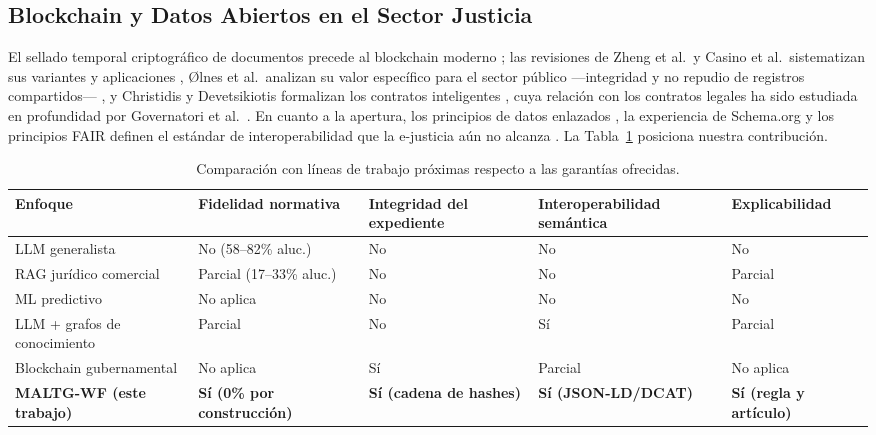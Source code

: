 \documentclass[computers,article,submit,pdftex,moreauthors]{Definitions/mdpi}
\begin{document}
\subsection{Blockchain y Datos Abiertos en el Sector Justicia}
El sellado temporal criptográfico de documentos precede al blockchain moderno \cite{Haber1991}; las revisiones de Zheng et al.\ y Casino et al.\ sistematizan sus variantes y aplicaciones \cite{Zheng2018,Casino2019}, Ølnes et al.\ analizan su valor específico para el sector público ---integridad y no repudio de registros compartidos--- \cite{Olnes2017}, y Christidis y Devetsikiotis formalizan los contratos inteligentes \cite{Christidis2016}, cuya relación con los contratos legales ha sido estudiada en profundidad por Governatori et al.\ \cite{Governatori2018}. En cuanto a la apertura, los principios de datos enlazados \cite{Bizer2009}, la experiencia de Schema.org \cite{Guha2016} y los principios FAIR \cite{Wilkinson2016} definen el estándar de interoperabilidad que la e-justicia aún no alcanza \cite{Rosa2013,Lupo2014}. La Tabla~\ref{tab:related} posiciona nuestra contribución.

\begin{table}[H]
\caption{Comparación con líneas de trabajo próximas respecto a las garantías ofrecidas.}
\label{tab:related}
\begin{tabularx}{\textwidth}{lXXXX}
\toprule
\textbf{Enfoque} & \textbf{Fidelidad normativa} & \textbf{Integridad del expediente} & \textbf{Interoperabilidad semántica} & \textbf{Explicabilidad}\\
\midrule
LLM generalista \cite{Dahl2024} & No (58--82\% aluc.) & No & No & No\\
RAG jurídico comercial \cite{Magesh2025} & Parcial (17--33\% aluc.) & No & No & Parcial\\
ML predictivo \cite{Katz2017,Medvedeva2020} & No aplica & No & No & No\\
LLM + grafos de conocimiento \cite{Pan2024} & Parcial & No & Sí & Parcial\\
Blockchain gubernamental \cite{Olnes2017} & No aplica & Sí & Parcial & No aplica\\
\textbf{MALTG-WF (este trabajo)} & \textbf{Sí (0\% por construcción)} & \textbf{Sí (cadena de hashes)} & \textbf{Sí (JSON-LD/DCAT)} & \textbf{Sí (regla y artículo)}\\
\bottomrule
\end{tabularx}
\end{table}

\end{document}

